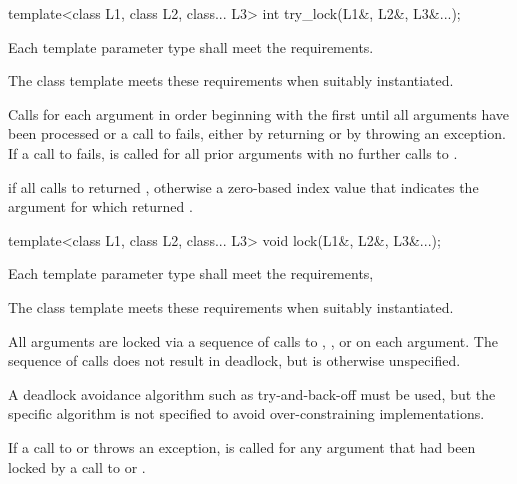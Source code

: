 %
\begin{itemdecl}
template<class L1, class L2, class... L3> int try_lock(L1&, L2&, L3&...);
\end{itemdecl}

\begin{itemdescr}
\pnum
\requires Each template parameter type shall meet the  requirements. \begin{note} The
 class template meets these requirements when suitably instantiated.
\end{note}

\pnum
\effects Calls  for each argument in order beginning with the
first until all arguments have been processed or a call to  fails,
either by returning  or by throwing an exception. If a call to
 fails,  is called for all prior arguments
with no further calls to .

\pnum
\returns {} if all calls to  returned ,
otherwise a zero-based index value that indicates the argument for which 
returned .
\end{itemdescr}

%
\begin{itemdecl}
template<class L1, class L2, class... L3> void lock(L1&, L2&, L3&...);
\end{itemdecl}

\begin{itemdescr}
\pnum
\requires Each template parameter type shall meet the  requirements,
\begin{note} The
 class template meets these requirements when suitably instantiated.
\end{note}

\pnum
\effects All arguments are locked via a sequence of calls to ,
, or  on each argument. The sequence of calls does
not result in deadlock, but is otherwise unspecified. \begin{note} A deadlock avoidance
algorithm such as try-and-back-off must be used, but the specific algorithm is not
specified to avoid over-constraining implementations. \end{note} If a call to
 or  throws an exception,  is
called for any argument that had been locked by a call to  or
.
\end{itemdescr}

